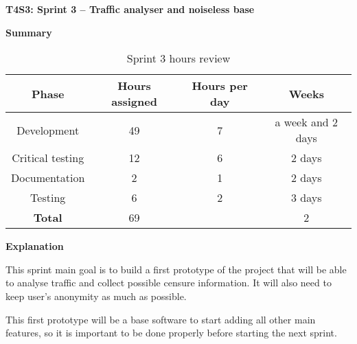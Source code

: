 \textbf{T4S3: Sprint 3 – Traffic analyser and noiseless base}

\textbf{Summary}
\begin{table}[!htb]
\centering
  \begin{tabular}{| c | c | c | c |}
  \hline Phase & Hours assigned & Hours per day & Weeks \\ \hline  
  Development & 49 & 7 & a week and 2 days       \\ \hline
  Critical testing & 12 & 6 & 2 days       \\ \hline
  Documentation & 2 & 1 & 2 days        \\ \hline 
  Testing & 6 & 2 & 3 days        \\ \hline \hline   
  \textbf{Total} & 69 &  & 2  \\ \hline
  \end{tabular}
  \caption{Sprint 3 hours review} \vspace{3pt}
  \label{tab:sprint3}
\end{table}

\textbf{Explanation}

This sprint main goal is to build a first prototype of the project that will be able to analyse traffic and collect possible censure information. It will also need to keep user's anonymity as much as possible.

This first prototype will be a base software to start adding all other main features, so it is important to be done properly before starting the next sprint.